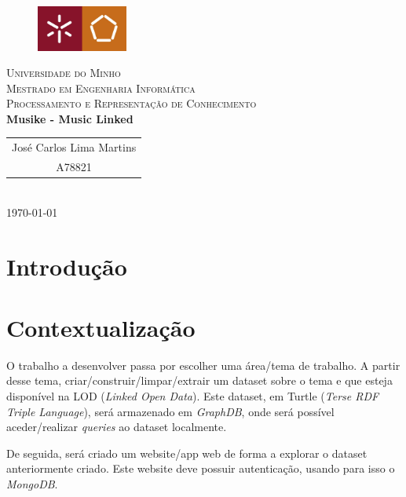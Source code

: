 \documentclass{article}
\begin{document}
{
\center
\begin{figure}[H]
        \centering
        \includegraphics[width=3cm]{Pictures/UM_EENG.jpg}
\end{figure}
\textsc{\Large Universidade do Minho} \\ [0.5cm]
\textsc{\Large Mestrado em Engenharia Informática} \\ [0.5cm]
\textsc{\large Processamento e Representação de Conhecimento} \\ [0.5cm]

{\LARGE \bfseries Musike - Music Linked} \\[0.5cm]

\begin{tabular}{c} 
    José Carlos Lima Martins \\
    A78821 \\
\end{tabular} \\[0.5cm]

\today \\[1cm]
}

\section{Introdução}


\tableofcontents

\section{Contextualização}

O trabalho a desenvolver passa por escolher uma área/tema de trabalho. A partir desse tema, criar/construir/limpar/extrair um dataset sobre o tema e que esteja disponível na LOD (\textit{Linked Open Data}). Este dataset, em Turtle (\textit{Terse RDF Triple Language}), será armazenado em \textit{GraphDB}, onde será possível aceder/realizar \textit{queries} ao dataset localmente.


De seguida, será criado um website/app web de forma a explorar o dataset anteriormente criado. Este website deve possuir autenticação, usando para isso o \textit{MongoDB}.

\end{document}

